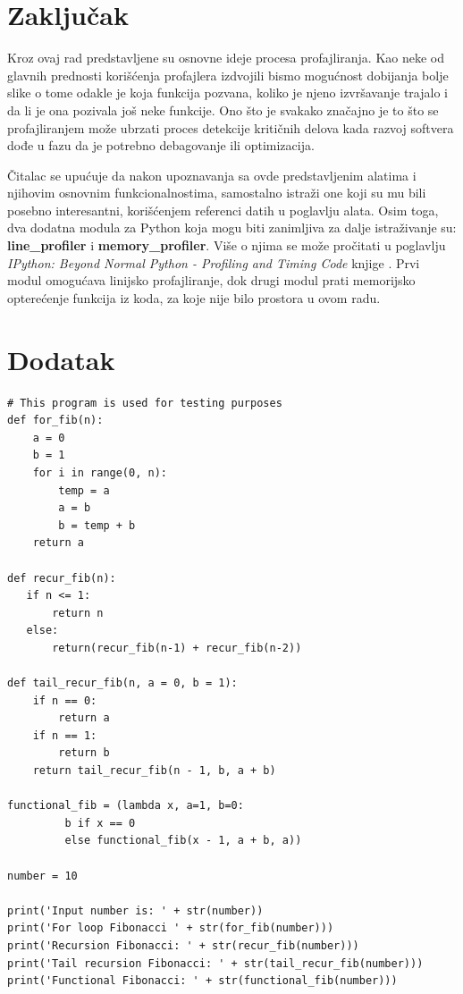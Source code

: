 \documentclass[a4paper]{article}
\begin{document}
\section{Zaključak}
\label{sec:zaključak}
Kroz ovaj rad predstavljene su osnovne ideje procesa profajliranja. Kao neke od glavnih prednosti korišćenja profajlera izdvojili bismo mogućnost dobijanja bolje slike o tome odakle je koja funkcija pozvana, koliko je njeno izvršavanje trajalo i da li je ona pozivala još neke funkcije. Ono što je svakako značajno je to što se profajliranjem  može ubrzati proces detekcije kritičnih delova kada razvoj softvera dođe u fazu da je potrebno debagovanje ili optimizacija.

Čitalac se upućuje da nakon upoznavanja sa ovde predstavljenim alatima i njihovim osnovnim funkcionalnostima, samostalno istraži one koji su mu bili posebno interesantni, korišćenjem referenci datih u poglavlju alata. Osim toga, dva dodatna modula za Python koja mogu biti zanimljiva za dalje istraživanje su: \textbf{line\_profiler} i \textbf{memory\_profiler}. Više o njima se može pročitati u poglavlju {\em IPython: Beyond Normal Python - Profiling and Timing Code} knjige \cite{vanderplas2016python}. Prvi modul omogućava linijsko profajliranje, dok drugi modul prati memorijsko opterećenje funkcija iz koda, za koje nije bilo prostora u ovom radu.  

\appendix
 

\newpage
\appendix
\section{Dodatak}
\label{sec:dodatak}

\begin{lstlisting}[caption={Kod korišćen za testiranje modula i alata},frame=single, label=lst:test_code]
# This program is used for testing purposes
def for_fib(n):
    a = 0
    b = 1
    for i in range(0, n):
        temp = a
        a = b
        b = temp + b
    return a

def recur_fib(n):
   if n <= 1:
       return n
   else:
       return(recur_fib(n-1) + recur_fib(n-2))
   
def tail_recur_fib(n, a = 0, b = 1): 
    if n == 0: 
        return a 
    if n == 1: 
        return b 
    return tail_recur_fib(n - 1, b, a + b)

functional_fib = (lambda x, a=1, b=0:
         b if x == 0
         else functional_fib(x - 1, a + b, a))

number = 10

print('Input number is: ' + str(number))
print('For loop Fibonacci ' + str(for_fib(number)))
print('Recursion Fibonacci: ' + str(recur_fib(number)))
print('Tail recursion Fibonacci: ' + str(tail_recur_fib(number)))
print('Functional Fibonacci: ' + str(functional_fib(number)))
\end{lstlisting}
\end{document}
